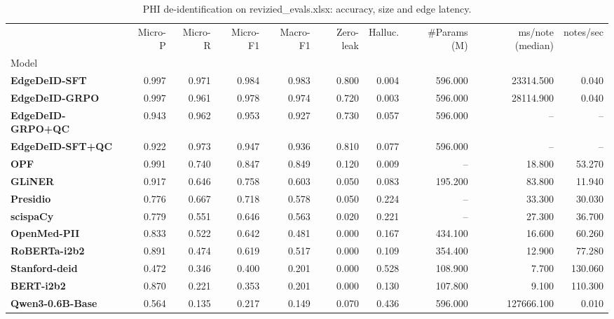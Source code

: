 \begin{table}
\caption{PHI de-identification on revizied_evals.xlsx: accuracy, size and edge latency.}
\label{tab:results}
\begin{tabular}{lrrrrrrrrr}
\toprule
 & Micro-P & Micro-R & Micro-F1 & Macro-F1 & Zero-leak & Halluc. & #Params (M) & ms/note (median) & notes/sec \\
Model &  &  &  &  &  &  &  &  &  \\
\midrule
\textbf{EdgeDeID-SFT} & 0.997 & 0.971 & 0.984 & 0.983 & 0.800 & 0.004 & 596.000 & 23314.500 & 0.040 \\
\textbf{EdgeDeID-GRPO} & 0.997 & 0.961 & 0.978 & 0.974 & 0.720 & 0.003 & 596.000 & 28114.900 & 0.040 \\
\textbf{EdgeDeID-GRPO+QC} & 0.943 & 0.962 & 0.953 & 0.927 & 0.730 & 0.057 & 596.000 & -- & -- \\
\textbf{EdgeDeID-SFT+QC} & 0.922 & 0.973 & 0.947 & 0.936 & 0.810 & 0.077 & 596.000 & -- & -- \\
\textbf{OPF} & 0.991 & 0.740 & 0.847 & 0.849 & 0.120 & 0.009 & -- & 18.800 & 53.270 \\
\textbf{GLiNER} & 0.917 & 0.646 & 0.758 & 0.603 & 0.050 & 0.083 & 195.200 & 83.800 & 11.940 \\
\textbf{Presidio} & 0.776 & 0.667 & 0.718 & 0.578 & 0.050 & 0.224 & -- & 33.300 & 30.030 \\
\textbf{scispaCy} & 0.779 & 0.551 & 0.646 & 0.563 & 0.020 & 0.221 & -- & 27.300 & 36.700 \\
\textbf{OpenMed-PII} & 0.833 & 0.522 & 0.642 & 0.481 & 0.000 & 0.167 & 434.100 & 16.600 & 60.260 \\
\textbf{RoBERTa-i2b2} & 0.891 & 0.474 & 0.619 & 0.517 & 0.000 & 0.109 & 354.400 & 12.900 & 77.280 \\
\textbf{Stanford-deid} & 0.472 & 0.346 & 0.400 & 0.201 & 0.000 & 0.528 & 108.900 & 7.700 & 130.060 \\
\textbf{BERT-i2b2} & 0.870 & 0.221 & 0.353 & 0.201 & 0.000 & 0.130 & 107.800 & 9.100 & 110.300 \\
\textbf{Qwen3-0.6B-Base} & 0.564 & 0.135 & 0.217 & 0.149 & 0.070 & 0.436 & 596.000 & 127666.100 & 0.010 \\
\bottomrule
\end{tabular}
\end{table}
